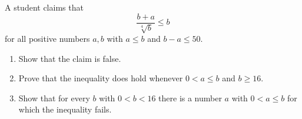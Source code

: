 A student claims that
\[\dfrac{b+a}{\sqrt[4]{b}}\le b\]
for all positive numbers $a,b$ with $a\le b$ and $b-a\le50$.
\begin{enumerate}
\item[(a)] Show that the claim is false.
\item[(b)] Prove that the inequality does hold whenever $0<a\le b$ and $b\ge16$.
\item[(c)] Show that for every $b$ with $0<b<16$ there is a number $a$ with $0<a\le b$ for which the inequality fails.
\end{enumerate}
